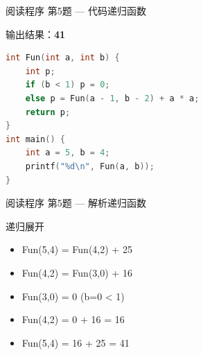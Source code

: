 \begin{frame}[fragile]{阅读程序 第5题 — 代码}{递归函数}
    \begin{exampleblock}{输出结果：\textbf{41}}
    \end{exampleblock}
    \begin{lstlisting}[language=C,basicstyle=\scriptsize\ttfamily]
int Fun(int a, int b) {
    int p;
    if (b < 1) p = 0;
    else p = Fun(a - 1, b - 2) + a * a;
    return p;
}
int main() {
    int a = 5, b = 4;
    printf("%d\n", Fun(a, b));
}
\end{lstlisting}
\end{frame}

\begin{frame}[fragile]{阅读程序 第5题 — 解析}{递归函数}
    \begin{alertblock}{递归展开}
        \footnotesize
        \begin{itemize}
            \setlength{\itemsep}{0pt}
            \item Fun(5,4) = Fun(4,2) + 25
            \item Fun(4,2) = Fun(3,0) + 16
            \item Fun(3,0) = 0 \quad (b=0 < 1)
            \item Fun(4,2) = 0 + 16 = 16
            \item Fun(5,4) = 16 + 25 = 41
        \end{itemize}
    \end{alertblock}
\end{frame}